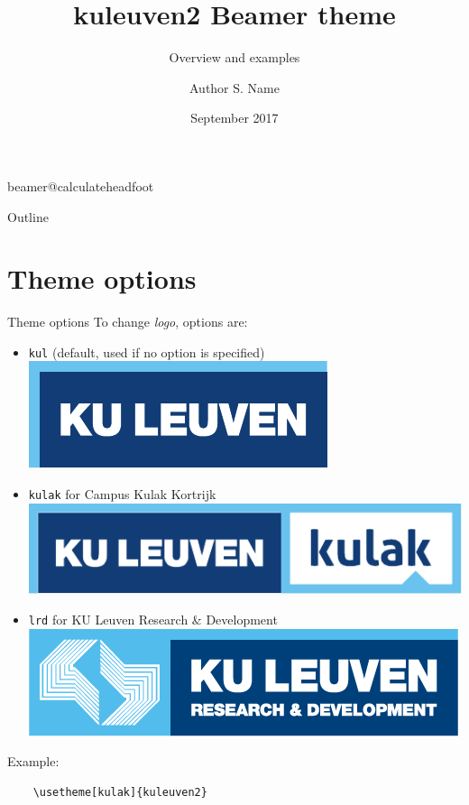 \documentclass[11pt,t]{beamer}
\title[kuleuven2 \LaTeX\ Beamer theme]{kuleuven2 Beamer theme} %
\subtitle{Overview and examples}
\author{Author S. Name}
\institute{KU Leuven}
\date{September 2017}
\begin{document}
\csname beamer@calculateheadfoot\endcsname %


\begin{frame}
	\titlepage
\end{frame}
	

\begin{frame}{Outline}
	\hfill	{\large \parbox{.961\textwidth}{\tableofcontents[hideothersubsections]}}
\end{frame}







\section{Theme options}
\begin{frame}[fragile]{Theme options}  %
To change \emph{logo}, options are:
\begin{itemize}
	\item \texttt{kul} \qquad (default, used if no option is specified) \includegraphics[height=.05\paperheight]{graphics/KUL.pdf}
	\item \texttt{kulak} \quad for Campus Kulak Kortrijk \includegraphics[height=.05\paperheight]{graphics/KULAK.pdf}
	\item \texttt{lrd} \qquad for KU Leuven Research \& Development \includegraphics[height=.05\paperheight]{graphics/LRD.png}
\end{itemize}

\vspace{24pt}
Example:
	\begin{verbatim}
	\usetheme[kulak]{kuleuven2}
	\end{verbatim}
\end{frame}
\end{document}

